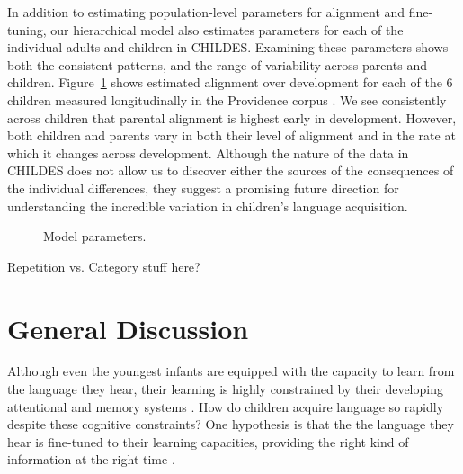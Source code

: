 \documentclass[10pt,letterpaper]{article}
\begin{document}
In addition to estimating population-level parameters for alignment and fine-tuning, our hierarchical model also estimates parameters for each of the individual adults and children in CHILDES. Examining these parameters shows both the consistent patterns, and the range of variability across parents and children. Figure~\ref{fig:providence_hpds} shows estimated alignment over development for each of the 6 children measured longitudinally in the Providence corpus \cite{demuth2006}. We see consistently across children that parental alignment is highest early in development. However, both children and parents vary in both their level of alignment and in the rate at which it changes across development. Although the nature of the data in CHILDES does not allow us to discover either the sources of the consequences of the individual differences, they suggest a promising future direction for understanding the incredible variation in children's language acquisition.

\begin{figure}[tb]
  \caption{\label{fig:providence_hpds} Model parameters.}
\end{figure}

Repetition vs. Category stuff here?

\section{General Discussion}

Although even the youngest infants are equipped with the capacity to learn from the language they hear, their learning is highly constrained by their developing attentional and memory systems \cite{vlach2013}. How do children acquire language so rapidly despite these cognitive constraints? One hypothesis is that the the language they hear is fine-tuned to their learning capacities, providing the right kind of information at the right time \cite{snow1972, vygotsky1978}.
\end{document}
